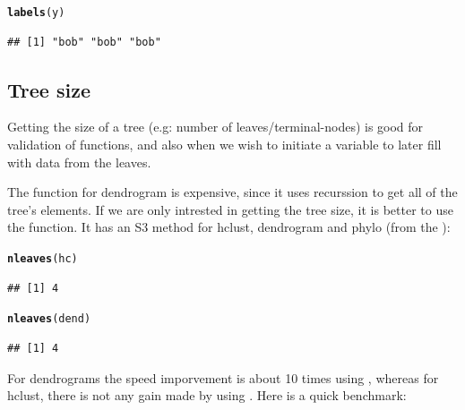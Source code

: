 \documentclass[shortnames,nojss,article]{jss}\usepackage{graphicx, color}
\makeatletter
\newcommand{\hlfunctioncall}[1]{\textcolor[rgb]{0.501960784313725,0,0.329411764705882}{\textbf{#1}}}%
\newenvironment{kframe}{%
 \def\at@end@of@kframe{}%
 \ifinner\ifhmode%
  \def\at@end@of@kframe{\end{minipage}}%
  \begin{minipage}{\columnwidth}%
 \fi\fi%
 \def\FrameCommand##1{\hskip\@totalleftmargin \hskip-\fboxsep
 \colorbox{shadecolor}{##1}\hskip-\fboxsep
     \hskip-\linewidth \hskip-\@totalleftmargin \hskip\columnwidth}%
 \MakeFramed {\advance\hsize-\width
   \@totalleftmargin\z@ \linewidth\hsize
   \@setminipage}}%
 {\par\unskip\endMakeFramed%
 \at@end@of@kframe}
\newenvironment{knitrout}{}{} %
\makeatother
\begin{document}
\begin{knitrout}
\begin{kframe}
{\ttfamily\noindent\color{warningcolor}{\#\# Warning: The lengths of the new labels is shorter than the length of the object's colnames - labels are recycled.}}\begin{alltt}
\hlfunctioncall{labels}(y)
\end{alltt}
\begin{verbatim}
## [1] "bob" "bob" "bob"
\end{verbatim}
\end{kframe}
\end{knitrout}



\subsection{Tree size}

Getting the size of a tree (e.g: number of leaves/terminal-nodes) is good for validation of functions, and also when we wish to initiate a variable to later fill with data from the leaves. 

The  function for dendrogram is expensive, since it uses recurssion to get all of the tree's elements. If we are only intrested in getting the tree size, it is better to use the  function. It has an S3 method for hclust, dendrogram and phylo (from the ):

\begin{knitrout}
\color{fgcolor}\begin{kframe}
\begin{alltt}
\hlfunctioncall{nleaves}(hc)
\end{alltt}
\begin{verbatim}
## [1] 4
\end{verbatim}
\begin{alltt}
\hlfunctioncall{nleaves}(dend)
\end{alltt}
\begin{verbatim}
## [1] 4
\end{verbatim}
\end{kframe}
\end{knitrout}


For dendrograms the speed imporvement is about 10 times using , whereas for hclust, there is not any gain made by using . Here is a quick benchmark:
\end{document}
